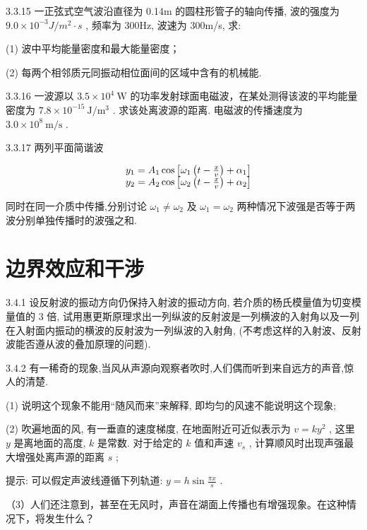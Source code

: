 \begin{problem}{3.3.15}
一正弦式空气波沿直径为 0.14m 的圆柱形管子的轴向传播, 波的强度为 $9.0 \times 10^{-3} J/m^{2} \cdot s$ , 频率为 300Hz, 波速为 300m/s, 求:

(1) 波中平均能量密度和最大能量密度；

(2) 每两个相邻质元同振动相位面间的区域中含有的机械能.
\end{problem}
\clearpage


\begin{problem}{3.3.16}
一波源以 $3.5 \times 10^{4} \mathrm{~W}$ 的功率发射球面电磁波，在某处测得该波的平均能量密度为 $7.8 \times 10^{-15} \mathrm{~J} / \mathrm{m}^{3}$ . 求该处离波源的距离. 电磁波的传播速度为 $3.0 \times 10^{8} \mathrm{~m} / \mathrm{s}$ .
\end{problem}
\clearpage


\begin{problem}{3.3.17}
两列平面简谐波

\[
\begin{array}{r l} & y _ {1} = A _ {1} \cos \left[ \omega_ {1} \left(t - \frac {x}{v}\right) + \alpha_ {1} \right] \\ & y _ {2} = A _ {2} \cos \left[ \omega_ {2} \left(t - \frac {x}{v}\right) + \alpha_ {2} \right] \end{array}
\]

同时在同一介质中传播,分别讨论 $\omega_{1}\neq\omega_{2}$ 及 $\omega_{1}=\omega_{2}$ 两种情况下波强是否等于两波分别单独传播时的波强之和.
\end{problem}
\clearpage


\section{边界效应和干涉}

\begin{problem}{3.4.1}
设反射波的振动方向仍保持入射波的振动方向, 若介质的杨氏模量值为切变模量值的 3 倍, 试用惠更斯原理求出一列纵波的反射波是一列横波的入射角以及一列在入射面内振动的横波的反射波为一列纵波的入射角, (不考虑这样的入射波、反射波能否遵从波的叠加原理的问题).
\end{problem}
\clearpage


\begin{problem}{3.4.2}
有一稀奇的现象,当风从声源向观察者吹时,人们偶而听到来自远方的声音,惊人的清楚.

(1) 说明这个现象不能用“随风而来”来解释, 即均匀的风速不能说明这个现象;

(2) 吹遍地面的风, 有一垂直的速度梯度, 在地面附近可近似表示为 $v = ky^2$ , 这里 $y$ 是离地面的高度, $k$ 是常数. 对于给定的 $k$ 值和声速 $v_{s}$ , 计算顺风时出现声强最大增强处离声源的距离 $s$ ;

提示: 可以假定声波线遵循下列轨道: $y = h \sin \frac{\pi x}{s}$ .

（3）人们还注意到，甚至在无风时，声音在湖面上传播也有增强现象。在这种情况下，将发生什么？
\end{problem}
\clearpage


